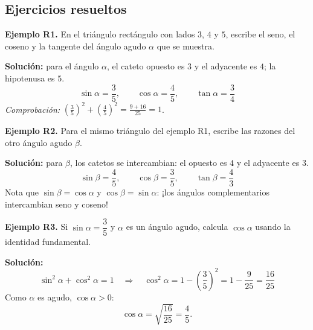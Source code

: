 \documentclass[12pt, letterpaper]{article}
\providecommand{\sen}{\sin}
\begin{document}
\newpage %

\subsection{Ejercicios resueltos}

\textbf{Ejemplo R1.} En el triángulo rectángulo con lados $3$, $4$ y $5$, escribe el seno, el coseno y la tangente del ángulo agudo $\alpha$ que se muestra.

\begin{center}
\end{center}

\begin{cuadrosolucion}
  \textbf{Solución:} para el ángulo $\alpha$, el cateto opuesto es $3$ y el adyacente es $4$; la hipotenusa es $5$.
  $$\sen \alpha = \frac{3}{5}, \qquad \cos \alpha = \frac{4}{5}, \qquad \tan \alpha = \frac{3}{4}$$
  \emph{Comprobación:} $\left(\frac{3}{5}\right)^2 + \left(\frac{4}{5}\right)^2 = \frac{9 + 16}{25} = 1$. \checkmark
\end{cuadrosolucion}

\textbf{Ejemplo R2.} Para el mismo triángulo del ejemplo R1, escribe las razones del otro ángulo agudo $\beta$.

\begin{cuadrosolucion}
  \textbf{Solución:} para $\beta$, los catetos se intercambian: el opuesto es $4$ y el adyacente es $3$.
  $$\sen \beta = \frac{4}{5}, \qquad \cos \beta = \frac{3}{5}, \qquad \tan \beta = \frac{4}{3}$$
  Nota que $\sen \beta = \cos \alpha$ y $\cos \beta = \sen \alpha$: ¡los ángulos complementarios intercambian seno y coseno!
\end{cuadrosolucion}

\textbf{Ejemplo R3.} Si $\sen \alpha = \dfrac{3}{5}$ y $\alpha$ es un ángulo agudo, calcula $\cos \alpha$ usando la identidad fundamental.

\begin{cuadrosolucion}
  \textbf{Solución:}
  $$\sen^2 \alpha + \cos^2 \alpha = 1 \quad \Rightarrow \quad \cos^2 \alpha = 1 - \left(\frac{3}{5}\right)^2 = 1 - \frac{9}{25} = \frac{16}{25}$$
  Como $\alpha$ es agudo, $\cos \alpha > 0$:
  $$\cos \alpha = \sqrt{\frac{16}{25}} = \frac{4}{5}.$$
\end{cuadrosolucion}
\end{document}
